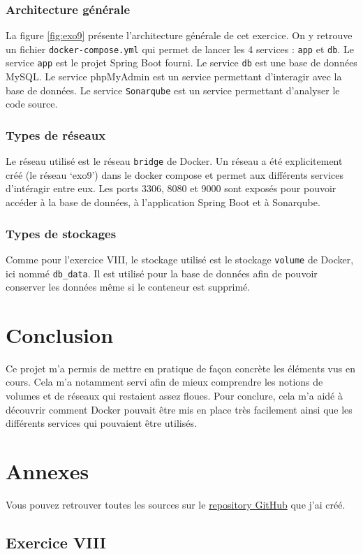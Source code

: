 \subsubsection*{Architecture générale}
La figure \ref{fig:exo9} présente l'architecture générale de cet exercice. On y retrouve un fichier \verb|docker-compose.yml| qui permet de lancer les 4 services : \verb|app| et \verb|db|. Le service \verb|app| est le projet Spring Boot fourni. Le service \verb|db| est une base de données MySQL. Le service phpMyAdmin est un service permettant d'interagir avec la base de données. Le service \verb|Sonarqube| est un service permettant d'analyser le code source.
\subsubsection*{Types de réseaux}
Le réseau utilisé est le réseau \verb|bridge| de Docker. Un réseau a été explicitement créé (le réseau `exo9') dans le docker compose et permet aux différents services d'intéragir entre eux. Les ports 3306, 8080 et 9000 sont exposés pour pouvoir accéder à la base de données, à l'application Spring Boot et à Sonarqube.
\subsubsection*{Types de stockages}
Comme pour l'exercice VIII, le stockage utilisé est le stockage \verb|volume| de Docker, ici nommé \verb|db_data|. Il est utilisé pour la base de données afin de pouvoir conserver les données même si le conteneur est supprimé.
\section{Conclusion}
Ce projet m'a permis de mettre en pratique de façon concrète les éléments vus en cours. Cela m'a notamment servi afin de mieux comprendre les notions de volumes et de réseaux qui restaient assez floues. Pour conclure, cela m'a aidé à découvrir comment Docker pouvait être mis en place très facilement ainsi que les différents services qui pouvaient être utilisés.
\newpage

\section{Annexes}\label{sec:Annexes}
Vous pouvez retrouver toutes les sources sur le \href{https://github.com/RemiSaurel/docker-homework}{repository GitHub} que j'ai créé.

\subsection*{Exercice VIII}

